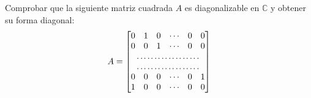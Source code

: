 \begin{enunciado}
 Comprobar que la siguiente matriz cuadrada $A$ es diagonalizable en $\mathbb{C}$ y obtener su forma diagonal:
 \begin{equation*}
  A =
  \left[
  \begin{matrix}
   \begin{matrix}
    0 & 1 & 0 & \cdots & 0 & 0 \\
    0 & 0 & 1 & \cdots & 0 & 0
   \end{matrix} \\
   \dotfill \hspace{-2pt} \dotfill \hspace{-2pt} \dotfill \hspace{-2pt} \dotfill \hspace{-2pt} \dotfill \hspace{-2pt} \dotfill \hspace{-2pt} \dotfill \hspace{-2pt} \dotfill \hspace{-2pt} \dotfill \\
   \dotfill \hspace{-2pt} \dotfill \hspace{-2pt} \dotfill \hspace{-2pt} \dotfill \hspace{-2pt} \dotfill \hspace{-2pt} \dotfill \hspace{-2pt} \dotfill \hspace{-2pt} \dotfill \hspace{-2pt} \dotfill \\
   \begin{matrix}
    0 & 0 & 0 & \cdots & 0 & 1 \\
    1 & 0 & 0 & \cdots & 0 & 0
   \end{matrix}
  \end{matrix}
  \right]
 \end{equation*}
\end{enunciado}

